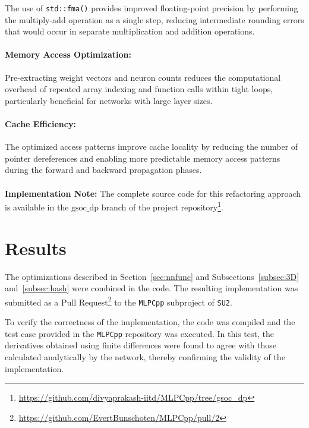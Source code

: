 \documentclass{article}
\begin{document}

The use of \texttt{std::fma()} provides improved floating-point precision by performing the multiply-add operation as a single step, reducing intermediate rounding errors that would occur in separate multiplication and addition operations. 

\paragraph{Memory Access Optimization:}
Pre-extracting weight vectors and neuron counts reduces the computational overhead of repeated array indexing and function calls within tight loops, particularly beneficial for networks with large layer sizes.

\paragraph{Cache Efficiency:}
The optimized access patterns improve cache locality by reducing the number of pointer dereferences and enabling more predictable memory access patterns during the forward and backward propagation phases.
\\
\\
\noindent\textbf{Implementation Note:} The complete source code for this refactoring approach is available in the \texttt{$\text{gsoc\_dp}$} branch of the project repository\footnote{\url{https://github.com/divyaprakash-iitd/MLPCpp/tree/gsoc_dp}}.

\section{Results}
\label{sec:results}

The optimizations described in Section~\ref{sec:nnfunc} and 
Subsections~\ref{subsec:3D} and~\ref{subsec:hash} were combined in the code. 
The resulting implementation was submitted as a Pull Request\footnote{\url{https://github.com/EvertBunschoten/MLPCpp/pull/2}} 
to the \texttt{MLPCpp} subproject of \texttt{SU2}. 

To verify the correctness of the implementation, the code was compiled and the 
test case provided in the \texttt{MLPCpp} repository was executed. In this test, 
the derivatives obtained using finite differences were found to agree with those 
calculated analytically by the network, thereby confirming the validity of the implementation.
\end{document}
